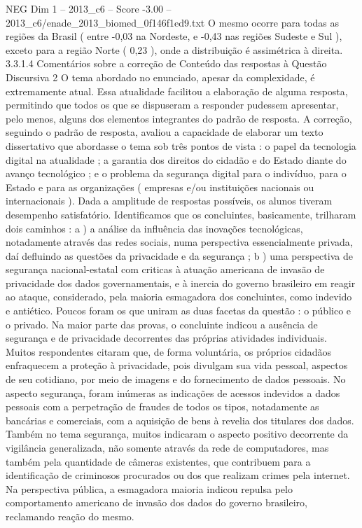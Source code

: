 \begin{textsample}{NEG Dim 1 – 2013\_c6 – Score -3.00 – 2013\_c6/enade\_2013\_biomed\_0f146f1ed9.txt}
O mesmo ocorre para todas as regiões da Brasil ( entre -0,03 na Nordeste, e -0,43 nas regiões Sudeste e Sul ), exceto para a região Norte ( 0,23 ), onde a distribuição é assimétrica à direita. 3.3.1.4 Comentários sobre a correção de Conteúdo das respostas à Questão Discursiva 2 O tema abordado no enunciado, apesar da complexidade, é extremamente atual.
Essa atualidade facilitou a elaboração de alguma resposta, permitindo que todos os que se dispuseram a responder pudessem apresentar, pelo menos, alguns dos elementos integrantes do padrão de resposta.
A correção, seguindo o padrão de resposta, avaliou a capacidade de elaborar um texto dissertativo que abordasse o tema sob três pontos de vista : o papel da tecnologia digital na atualidade ; a garantia dos direitos do cidadão e do Estado diante do avanço tecnológico ; e o problema da segurança digital para o indivíduo, para o Estado e para as organizações ( empresas e/ou instituições nacionais ou internacionais ).
Dada a amplitude de respostas possíveis, os alunos tiveram desempenho satisfatório.
Identificamos que os concluintes, basicamente, trilharam dois caminhos : a ) a análise da influência das inovações tecnológicas, notadamente através das redes sociais, numa perspectiva essencialmente privada, daí defluindo as questões da privacidade e da segurança ; b ) uma perspectiva de segurança nacional-estatal com criticas à atuação americana de invasão de privacidade dos dados governamentais, e à inercia do governo brasileiro em reagir ao ataque, considerado, pela maioria esmagadora dos concluintes, como indevido e antiético.
Poucos foram os que uniram as duas facetas da questão : o público e o privado.
Na maior parte das provas, o concluinte indicou a ausência de segurança e de privacidade decorrentes das próprias atividades individuais.
Muitos respondentes citaram que, de forma voluntária, os próprios cidadãos enfraquecem a proteção à privacidade, pois divulgam sua vida pessoal, aspectos de seu cotidiano, por meio de imagens e do fornecimento de dados pessoais.
No aspecto segurança, foram inúmeras as indicações de acessos indevidos a dados pessoais com a perpetração de fraudes de todos os tipos, notadamente as bancárias e comerciais, com a aquisição de bens à revelia dos titulares dos dados.
Também no tema segurança, muitos indicaram o aspecto positivo decorrente da vigilância generalizada, não somente através da rede de computadores, mas também pela quantidade de câmeras existentes, que contribuem para a identificação de criminosos procurados ou dos que realizam crimes pela internet.
Na perspectiva pública, a esmagadora maioria indicou repulsa pelo comportamento americano de invasão dos dados do governo brasileiro, reclamando reação do mesmo.

\end{textsample}
